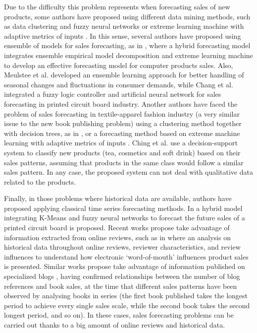 \documentclass[a4paper,10pt,onecolumn,preprint,3p]{elsarticle}
\begin{document}
Due to the difficulty this problem represents when forecasting sales of new 
products, some authors have proposed using different data mining methods, such as
data clustering and fuzzy neural networks \cite{Chang2009}  or
extreme learning machine with adaptive metrics of inputs \cite{Xia2012}.
In this sense, several authors have proposed using ensemble of models for sales forecasting, 
as in \cite{ChiJie2012}, where a hybrid forecasting model integrates ensemble 
empirical model decomposition and extreme learning machine to develop an effective 
forecasting model for computer products sales.
Also, Meulstee et al. \cite{Meulstee2008} developed an ensemble learning approach 
for better handling of seasonal changes and fluctuations in consumer demands,
while Chang et al. \cite{Chang2006715} integrated a fuzzy logic controller 
and artificial neural network for sales forecasting in printed circuit board industry.
Another authors have faced the problem of sales forecasting in textile-apparel 
fashion industry (a very similar issue to the new book publishing problem) 
using a clustering method together with decision trees, as in \cite{SThomassey2014},  or
a forecasting method based on extreme machine learning with adaptive metrics 
of inputs \cite{Xia2012}.
Ching et al. \cite{ChingChin2010} use a decision-support system to classify new 
products (tea, cosmetics and soft drink) based on their sales patterns, assuming 
that products in the same class would follow a similar sales pattern. 
In any case, the proposed system can not deal with qualitative 
data related to the products. 

Finally, in those problems where historical data are available, authors have 
proposed applying classical time series forecasting methods.
In \cite{Chang2009} a hybrid model integrating K-Means and fuzzy neural networks 
to forecast the future sales of a printed circuit board is proposed.
Recent works propose take advantage of information extracted from online reviews, 
such as in \cite{ChernWSF15} where an analysis on historical data throughout online 
reviews, reviewer characteristics, and review influences to understand how 
electronic `word-of-mouth' influences product sales is presented.
Similar works propose take advantage of information published on specialized 
blogs \cite{Moon2010ICSSSM,Moon2010ICEC}, having confirmed relationships between 
the number of blog references and book sales, at the time that different sales 
patterns have been observed by analysing books in series (the first book published 
takes the longest period to achieve every single sales scale, while the second book 
takes the second longest period, and so on).
In these cases, sales forecasting problems can be carried out thanks to a big 
amount of online reviews and historical data.
\end{document}
